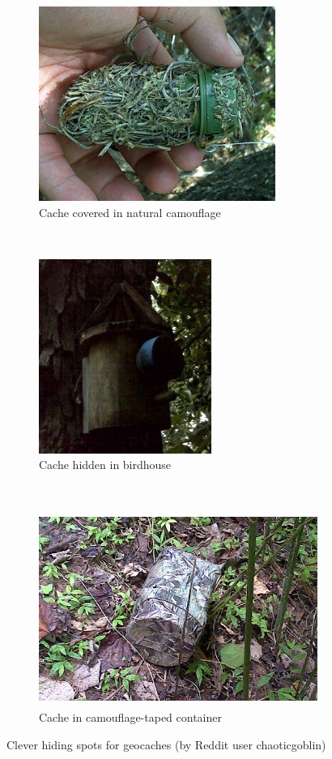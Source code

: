\begin{figure}[h]
	\centering
	\begin{subfigure}[t]{0.5\textwidth}
		\includegraphics[height=2.5in]{Figures/chaoticgoblin-geocache-covered}
		\caption{Cache covered in natural camouflage}
	\end{subfigure}
	~
	\begin{subfigure}[t]{0.4\textwidth}
		\includegraphics[height=2.5in]{Figures/chaoticgoblin-geocache-birdhouse}
		\caption{Cache hidden in birdhouse}
	\end{subfigure}
	~
	\begin{subfigure}[t]{\textwidth}
		\centering
		\includegraphics[height=2.5in]{Figures/chaoticgoblin-geocache-camo}
		\caption{Cache in camouflage-taped container}
	\end{subfigure}
	\caption{Clever hiding spots for geocaches (by Reddit user chaoticgoblin)}
	\label{fig:geocache-spots}
\end{figure}

